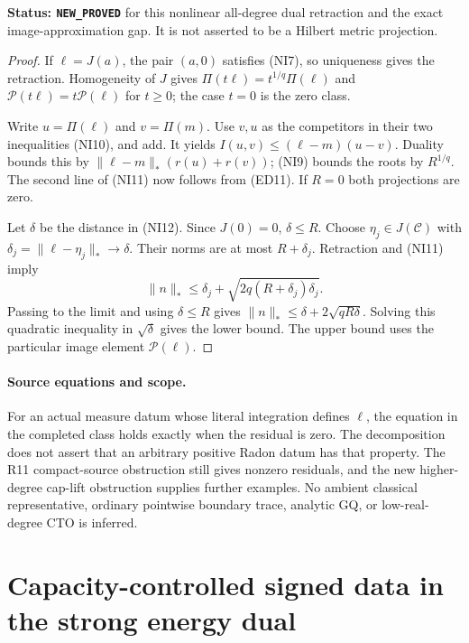\documentclass[11pt,a4paper]{article}
\numberwithin{equation}{section}
\theoremstyle{definition}
\theoremstyle{remark}
\begin{document}
\noindent\textbf{Status: \texttt{NEW\_PROVED}} for this nonlinear
all-degree dual retraction and the exact image-approximation gap.
It is not asserted to be a Hilbert metric projection.

\begin{proof}
If $\ell=J(a)$, the pair $(a,0)$ satisfies (NI7), so uniqueness
gives the retraction. Homogeneity of $J$ gives
$\Pi(t\ell)=t^{1/q}\Pi(\ell)$ and
$\mathcal P(t\ell)=t\mathcal P(\ell)$ for $t\geq0$;
the case $t=0$ is the zero class.

Write $u=\Pi(\ell)$ and $v=\Pi(m)$. Use $v,u$ as the
competitors in their two inequalities (NI10), and add. It yields
$I(u,v)\leq(\ell-m)(u-v)$. Duality bounds this by
$\|\ell-m\|_*(r(u)+r(v))$; (NI9) bounds the roots by
$R^{1/q}$. The second line of (NI11) now follows from (ED11).
If $R=0$ both projections are zero.

Let $\delta$ be the distance in (NI12). Since $J(0)=0$,
$\delta\leq R$. Choose $\eta_j\in J(\mathscr C)$ with
$\delta_j=\|\ell-\eta_j\|_*\to\delta$. Their norms are
at most $R+\delta_j$. Retraction and (NI11) imply
\[
 \|n\|_*\leq\delta_j+
               \sqrt{2q(R+\delta_j)\delta_j}.
\]
Passing to the limit and using $\delta\leq R$ gives
$\|n\|_*\leq\delta+2\sqrt{qR\delta}$. Solving this
quadratic inequality in $\sqrt\delta$ gives the lower bound.
The upper bound uses the particular image element $\mathcal P(\ell)$.
\end{proof}

\paragraph{Source equations and scope.}
For an actual measure datum whose literal integration defines $\ell$,
the equation in the completed class holds exactly when the residual
is zero. The decomposition does not assert that an arbitrary positive
Radon datum has that property. The R11 compact-source obstruction
still gives nonzero residuals, and the new higher-degree cap-lift
obstruction supplies further examples. No ambient classical
representative, ordinary pointwise boundary trace, analytic GQ,
or low-real-degree CTO is inferred.



\section{Capacity-controlled signed data in the strong energy dual}
\label{sec:r12-capacity-dual-data}
\end{document}
